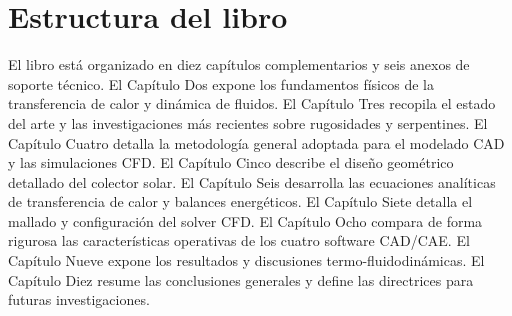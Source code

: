 \section{Estructura del libro}
\label{sec:cap01_estructura}

El libro está organizado en diez capítulos complementarios y seis anexos de soporte técnico.
El Capítulo Dos expone los fundamentos físicos de la transferencia de calor y dinámica de fluidos.
El Capítulo Tres recopila el estado del arte y las investigaciones más recientes sobre rugosidades y serpentines.
El Capítulo Cuatro detalla la metodología general adoptada para el modelado CAD y las simulaciones CFD.
El Capítulo Cinco describe el diseño geométrico detallado del colector solar.
El Capítulo Seis desarrolla las ecuaciones analíticas de transferencia de calor y balances energéticos.
El Capítulo Siete detalla el mallado y configuración del solver CFD.
El Capítulo Ocho compara de forma rigurosa las características operativas de los cuatro software CAD/CAE.
El Capítulo Nueve expone los resultados y discusiones termo-fluidodinámicas.
El Capítulo Diez resume las conclusiones generales y define las directrices para futuras investigaciones.
